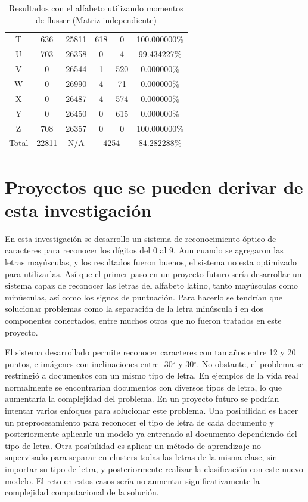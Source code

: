 \documentclass[a4paper, 11pt, oneside]{report}
\begin{document}
\begin{table}
\begin{tabular}{|c|c|c|c|c|c|}
	T & 636 & 25811 & 618 & 0 & 100.000000\% \\ 
	U & 703 & 26358 & 0 & 4 & 99.434227\% \\ 
	V & 0 & 26544 & 1 & 520 & 0.000000\% \\ 
	W & 0 & 26990 & 4 & 71 & 0.000000\% \\ 
	X & 0 & 26487 & 4 & 574 & 0.000000\% \\ 
	Y & 0 & 26450 & 0 & 615 & 0.000000\% \\ 
	Z & 708 & 26357 & 0 & 0 & 100.000000\% \\ 
	\hline
	Total & 22811 & N/A & \multicolumn{2}{|c|}{4254} & 84.282288\% \\
	\hline
\end{tabular}
\caption{Resultados con el alfabeto utilizando momentos de flusser (Matriz independiente)}
\label{tb:alphaRotIndep}
\end{table}

\section{Proyectos que se pueden derivar de esta investigación}


En esta investigación se desarrollo un sistema de reconocimiento óptico de caracteres para reconocer los dígitos del 0 al 9. Aun cuando se agregaron las letras mayúsculas, y los resultados fueron buenos, el sistema no esta optimizado para utilizarlas. Así que el primer paso en un proyecto futuro sería desarrollar un sistema capaz de reconocer las letras del alfabeto latino, tanto mayúsculas como minúsculas, así como los signos de puntuación. Para hacerlo se tendrían que solucionar problemas como la separación de la letra minúscula i en dos componentes conectados, entre muchos otros que no fueron tratados en este proyecto.

El sistema desarrollado permite reconocer caracteres con tamaños entre 12 y 20 puntos, e imágenes con inclinaciones entre -30$^{\circ}$ y 30$^{\circ}$. No obstante, el problema se restringió a documentos con un mismo tipo de letra. En ejemplos de la vida real normalmente se encontrarían documentos con diversos tipos de letra, lo que aumentaría la complejidad del problema. En un proyecto futuro se podrían intentar varios enfoques para solucionar este problema. Una posibilidad es hacer un preprocesamiento para reconocer el tipo de letra de cada documento y posteriormente aplicarle un modelo ya entrenado al documento dependiendo del tipo de letra. Otra posibilidad es aplicar un método de aprendizaje no supervisado para separar en clusters todas las letras de la misma clase, sin importar su tipo de letra, y posteriormente realizar la clasificación con este nuevo modelo. El reto en estos casos sería no aumentar significativamente la complejidad computacional de la solución.
\end{document}
